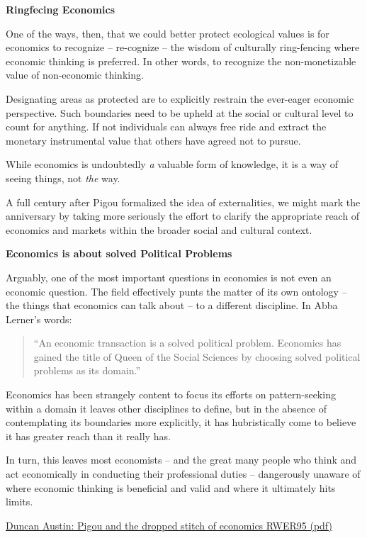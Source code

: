 \documentclass[
]{book}
\begin{document}
\textbf{Ringfecing Economics}

One of the ways, then, that we could better protect ecological values is for economics to
recognize -- re-cognize -- the wisdom of culturally ring-fencing where economic thinking is
preferred. In other words, to recognize the non-monetizable value of non-economic thinking.

Designating areas as protected are to explicitly restrain the ever-eager economic perspective.
Such boundaries need to be upheld at the social or cultural level to count for anything.
If not individuals can always free ride and extract the monetary instrumental value
that others have agreed not to pursue.

While economics is undoubtedly \emph{a} valuable form of knowledge, it is a way of seeing things,
not \emph{the} way.

A full century after Pigou formalized the idea of externalities, we might mark the
anniversary by taking more seriously the effort to clarify the appropriate reach of economics
and markets within the broader social and cultural context.

\textbf{Economics is about solved Political Problems}

Arguably, one of the most important questions in economics is not even an economic
question.
The field effectively punts the matter of its own ontology -- the things that economics
can talk about -- to a different discipline. In Abba Lerner's words:

\begin{quote}
``An economic transaction is a solved political problem. Economics has
gained the title of Queen of the Social Sciences by choosing solved political
problems as its domain.''
\end{quote}

Economics has been strangely content to focus its efforts on pattern-seeking within a domain
it leaves other disciplines to define, but in the absence of contemplating its boundaries more
explicitly, it has hubristically come to believe it has greater reach than it really has.

In turn, this leaves most economists -- and the great many people who think and act
economically in conducting their professional duties -- dangerously unaware of where
economic thinking is beneficial and valid and where it ultimately hits limits.

\href{pdf/Austin_2021_Pigou_and_the_dropped_stitch_of_economics_RWER95.pdf}{Duncan Austin: Pigou and the dropped stitch of economics RWER95 (pdf)}
\end{document}

